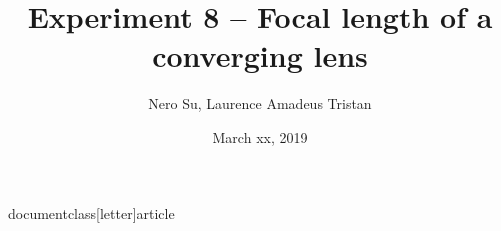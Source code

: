 documentclass[letter]{article}
\usepackage[utf8]{inputenc}

\usepackage{graphicx}
\usepackage{wrapfig}

\usepackage{microtype}

\usepackage{mhsetup}
\usepackage{mathtools}

\usepackage{amssymb}
\usepackage{textcomp}
\usepackage{siunitx}

\usepackage[parfill]{parskip}
\usepackage{array}

\graphicspath{ {./images/} }


\title{Experiment 8 -- Focal length of a converging lens}
\author{Nero Su, Laurence Amadeus Tristan}
\date{March xx, 2019}


\maketitle

